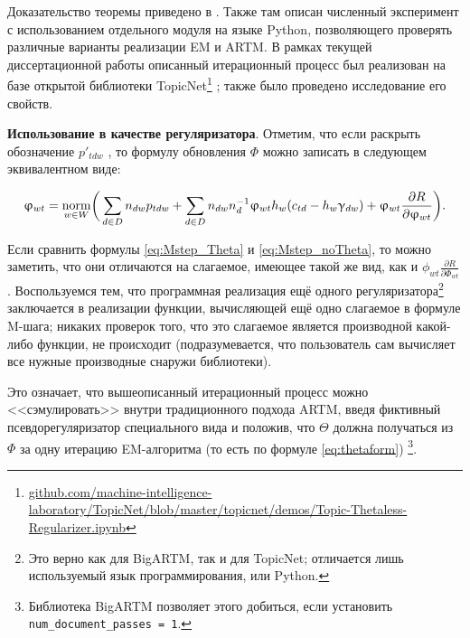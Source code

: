 Доказательство теоремы приведено в \cite{thetaless}. Также там описан численный эксперимент с использованием отдельного модуля на языке Python, позволяющего проверять различные варианты реализации EM и ARTM. В рамках текущей диссертационной работы описанный итерационный процесс был реализован на базе открытой библиотеки TopicNet\footnote{\url{github.com/machine-intelligence-laboratory/TopicNet/blob/master/topicnet/demos/Topic-Thetaless-Regularizer.ipynb}}
; также было проведено исследование его свойств.

\textbf{Использование в качестве регуляризатора}. Отметим, что если раскрыть обозначение $p'_{tdw}$ , то формулу обновления $\Phi$ можно записать в следующем эквивалентном виде:

\begin{equation} \label{eq:Mstep_noTheta}   
    \upvarphi_{wt} = \mathop{\mathrm{norm}}\limits_{w\in W}
        \biggl(\,
        \sum_{d\in D} n_{dw} p_{tdw}
        + \sum_{d\in D} n_{dw} n_d^{-1} \upvarphi_{wt}h_w (c_{td}-h_w\upgamma_{dw})
        + \upvarphi_{wt} \frac{\partial{R}}{\partial{\ensuremath{\upvarphi}_{wt}}}
        \biggr).
\end{equation}

Если сравнить формулы \eqref{eq:Mstep_Theta} и \eqref{eq:Mstep_noTheta}, то можно заметить, что они отличаются на слагаемое, имеющее такой же вид, как и $\phi_{wt} \frac{\partial{R}}{\partial{\Phi_{wt}}}$. Воспользуемся тем, что программная реализация ещё одного регуляризатора\footnote{Это верно как для BigARTM, так и для TopicNet; отличается лишь используемый язык программирования, \cpp или Python.}  заключается в реализации функции, вычисляющей ещё одно слагаемое в формуле M-шага; никаких проверок того, что это слагаемое является производной какой-либо функции, не происходит (подразумевается, что пользователь сам вычисляет все нужные производные снаружи библиотеки).

Это означает, что вышеописанный итерационный процесс можно <<сэмулировать>> внутри традиционного подхода ARTM, введя фиктивный псевдорегуляризатор специального вида и положив, что $\Theta$ должна получаться из $\Phi$ за одну итерацию EM-алгоритма (то есть по формуле \eqref{eq:thetaform}) \footnote{Библиотека BigARTM позволяет этого добиться, если установить \texttt{num\_document\_passes\ =\ 1}.}.


